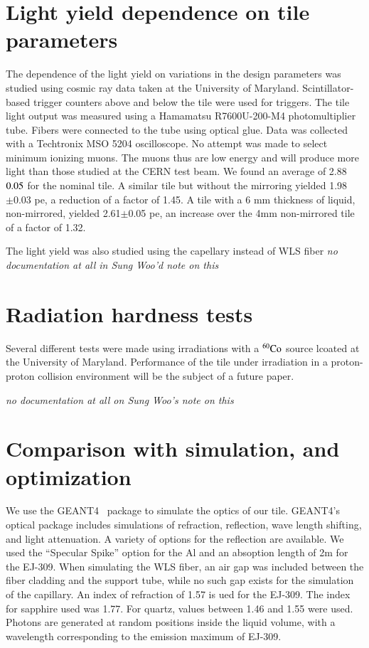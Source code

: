 \documentclass[review]{elsarticle}
\begin{document}
\section{Light yield dependence on tile parameters}

The dependence of the light yield on variations in the design parameters was studied using cosmic ray data taken at the University of Maryland.  Scintillator-based trigger counters above and below the tile were used for triggers.  The tile light output was measured using a Hamamatsu R7600U-200-M4 photomultiplier tube.  Fibers were connected to the tube using optical glue.  Data was collected with a Techtronix MSO 5204 oscilloscope.  No attempt was made to select
minimum ionizing muons.  The muons thus are low energy and will produce more light than those studied at the CERN test beam.  We found an average of 2.88${\rm } 0.05$ for the nominal tile.  A similar tile but without the mirroring yielded 1.98${\pm} 0.03$ pe, a reduction of a factor of 1.45.  A tile with a 6 mm thickness of liquid, non-mirrored, yielded 2.61${\pm }$0.05 pe, an increase over the 4mm non-mirrored tile of a factor of 1.32.

The light yield was also studied using the capellary instead of WLS fiber {\it no documentation at all in Sung Woo'd note on this}

\section{Radiation hardness tests}

Several different tests were made using irradiations with a $\rm{^{60}Co}$ source lcoated at the University of Maryland.  Performance of the tile under irradiation in a proton-proton collision environment will be the subject of a future paper.


{\it no documentation at all on Sung Woo's note on this}

\section{Comparison with simulation, and optimization}
We use the GEANT4~\cite{Agostinelli2003250} package to simulate the optics of our tile.  GEANT4's optical package includes simulations of refraction, reflection, wave length shifting, and light attenuation.  A variety of options for the reflection are available.  We used the ``Specular Spike'' option for the Al and an absoption length of 2m for the EJ-309.  When simulating the WLS fiber, an air gap was included between the fiber cladding and the support tube, while no such gap exists for the simulation of the capillary. An index of refraction of 1.57 is ued for the EJ-309.  The index for sapphire used was 1.77.  For quartz, values between 1.46 and 1.55 were used.
Photons are generated at random positions inside the liquid volume, with a wavelength corresponding to the emission maximum of EJ-309.  
\end{document}
